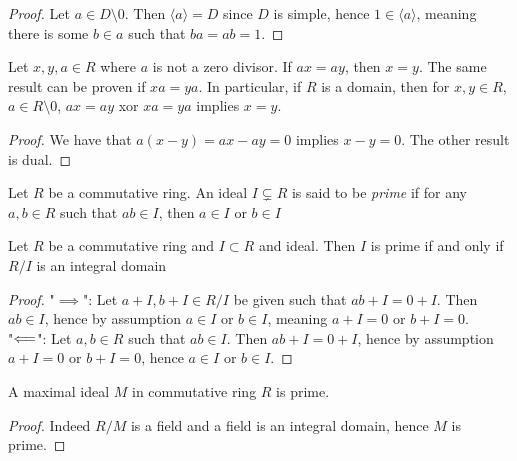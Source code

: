 \begin{proof}
    Let $a\in D\setminus 0$. Then $\langle a \rangle = D$ since $D$ is simple, hence $1\in \langle a\rangle$, meaning there is some $b\in a$ such that $ba = ab = 1$. 
\end{proof}
\begin{lemma}\label{WeCanDivideByElementsWhichAreNotZeroDivisors}
    Let $x,y, a\in R$ where $a$ is not a zero divisor. If $ax = ay$, then $x=y$. The same result can be proven if $xa = ya$. In particular, if $R$ is a domain, then for $x,y\in R$, $a\in R\setminus 0$, $ax=ay$ xor $xa=ya$ implies $x=y$. 
\end{lemma}
\begin{proof}
    We have that $a(x-y)=ax-ay = 0$ implies $x-y=0$. The other result is dual. 
\end{proof}
\begin{definition}
    Let $R$ be a commutative ring. An ideal $I\subsetneq R$ is said to be \textit{prime} if for any $a,b \in R$ such that $ab\in I$, then $a \in I$ or $b\in I$   
\end{definition}
\begin{lemma}\label{PrimeIdealIffQuotientRingID}
    Let $R$ be a commutative ring and $I\subset R$ and ideal. Then $I$ is prime if and only if $R/I$ is an integral domain
\end{lemma}
\begin{proof}
    "$\implies$": Let $a+I,b+I\in R/I$ be given such that $ab + I = 0 +I$. Then $ab\in I$, hence by assumption $a \in I$ or $b\in I$, meaning $a + I = 0$ or $b+ I =0$.\\
    "$\Longleftarrow$": Let $a,b\in R$ such that $ab \in I$. Then $ab + I = 0 + I$, hence by assumption $a+I = 0$ or $b + I = 0$, hence $a\in I$ or $b\in I$. 
\end{proof}
\begin{corollary}
    A maximal ideal $M$ in commutative ring $R$ is prime.
\end{corollary}
\begin{proof}
    Indeed $R/M$ is a field and a field is an integral domain, hence $M$ is prime.
\end{proof}

